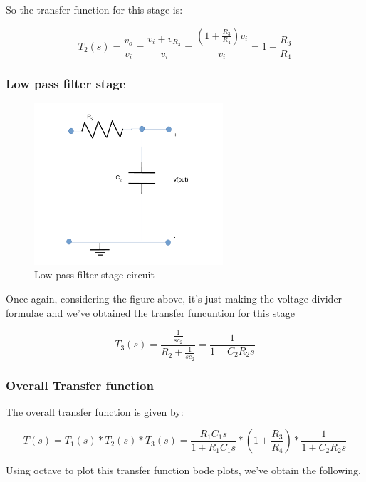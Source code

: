 So the transfer function for this stage is:

\begin{equation}
T_2(s) = \frac{v_o}{v_i} = \frac{v_i + v_{R_3}}{v_i} = \frac{(1+\frac{R_3}{R_4})v_i}{v_i} = 1 + \frac{R_3}{R_4}
\end{equation} 

\subsubsection{Low pass filter stage}

\begin{figure}[H] 
\centering
\includegraphics[width= 7cm]{low_pass_l5.pdf} 
\caption{Low pass filter stage circuit}
\label{lowpass}
\end{figure}

Once again, considering the figure above, it's just making the voltage divider formulae and we've obtained the transfer funcuntion for this stage

\begin{equation}
T_3(s) = \frac{\frac{1}{sc_2}}{R_2 + \frac{1}{sc_2}} = \frac{1}{1+ C_2R_2s}
\end{equation} 

\subsubsection{Overall Transfer function}

The overall transfer function is given by:

\begin{equation}
T(s) = T_1(s)*T_2(s)*T_3(s) = \frac{R_1C_1s}{1+R_1C_1s}*(1 + \frac{R_3}{R_4})*\frac{1}{1+ C_2R_2s}
\end{equation} 

Using octave to plot this transfer function bode plots, we've obtain the following.

